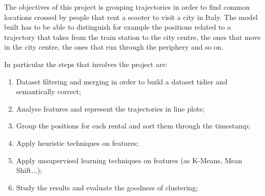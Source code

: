 The objectives of this project is grouping trajectories in order to find common locations crossed by people that rent a scooter to visit a city in Italy. The model built has to be able to distinguish for example the positions related to a trajectory that takes from the train station to the city centre, the ones that move in the city centre, the ones that run through the periphery and so on. 

In particular the steps that involves the project are:
\begin{enumerate}
	\item Dataset filtering and merging in order to build a dataset tidier and semantically correct;
	\item Analyse features and represent the trajectories in line plots;
	\item Group the positions for each rental and sort them through the timestamp;
	\item Apply heuristic techniques on features;
	\item Apply unsupervised learning techniques on features (as K-Means, Mean Shift...);  
	\item Study the results and evaluate the goodness of clustering;
\end{enumerate}